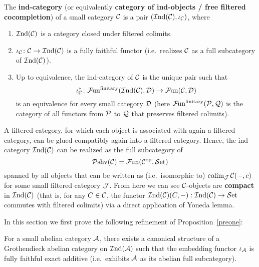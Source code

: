 \documentclass[twoside]{article}
\begin{document}
\begin{defn}
The \textbf{ind-category} (or equivalently \textbf{category of ind-objects / free filtered cocompletion}) of a small category ${\mathcal{C}}$ is a pair $(\mathcal{I}\mathrm{nd}({\mathcal{C}}), \iota_{\mathcal{C}})$, where 
\begin{enumerate}
\item $\mathcal{I}\mathrm{nd}({\mathcal{C}})$ is a category closed under filtered colimits.

\item $\iota_{\mathcal{C}}\colon {\mathcal{C}} \rightarrow  \mathcal{I}\mathrm{nd}({\mathcal{C}})$ is a fully faithful functor (i.e.\ realizes ${\mathcal{C}}$ as a full subcategory of $\mathcal{I}\mathrm{nd}({\mathcal{C}})$).

\item Up to equivalence, the ind-category of ${\mathcal{C}}$ is the unique pair such that 
$$\iota_{\mathcal{C}}^\ast\colon \mathcal{F}\mkern-2mu\mathrm{un}^{\mathrm{finitary}}(\mathcal{I}\mathrm{nd}({\mathcal{C}}), {\mathcal{D}}) \rightarrow \mathcal{F}\mkern-2mu\mathrm{un}({\mathcal{C}}, {\mathcal{D}})$$
is an equivalence for every small category ${\mathcal{D}}$ (here $ \mathcal{F}\mkern-2mu\mathrm{un}^{\mathrm{finitary}}({\mathcal{P}}, {\mathcal{Q}})$ is the category of all functors from ${\mathcal{P}}$ to ${\mathcal{Q}}$ that preserves filtered colimits).
\end{enumerate}
\end{defn}

\begin{rem}\label{rem1}
A filtered category, for which each object is associated with again a filtered category, can be glued compatibly again into a filtered category. Hence, the ind-category $\mathcal{I}\mathrm{nd}({\mathcal{C}})$ can be realized as the full subcategory of $$\mathcal{P}\mathrm{shv}({\mathcal{C}}) = \mathcal{F}\mkern-2mu\mathrm{un}({\mathcal{C}}^{\mathrm{op}}, \mathcal{S}\mathrm{et})$$ spanned by all objects that can be written as (i.e.\ isomorphic to) $\operatorname*{\mathrm{colim}}_{{\mathcal{J}}} {\mathcal{C}}(-,c)$ for some small filtered category ${\mathcal{J}}$.
From here we can see ${\mathcal{C}}$-objects are \textbf{compact} in $\mathcal{I}\mathrm{nd}({\mathcal{C}})$ (that is, for any $C \in {\mathcal{C}}$, the functor $\mathcal{I}\mathrm{nd}({\mathcal{C}})(C, -): \mathcal{I}\mathrm{nd}({\mathcal{C}}) \rightarrow \mathcal{S}\mathrm{et}$ commutes with filtered colimits) via a direct application of Yoneda lemma.
\end{rem}

In this section we first prove the following refinement of Proposition~\ref{preone}:

\begin{prop}\label{preoneprime}
For a small abelian category ${\mathcal{A}}$, there exists a canonical structure of a Grothendieck abelian category on $\mathcal{I}\mathrm{nd}({\mathcal{A}})$ such that the embedding functor $\iota_{\mathcal{A}}$ is fully faithful exact additive (i.e.\ exhibits ${\mathcal{A}}$ as its abelian full subcategory). 
\end{prop}

\end{document}
